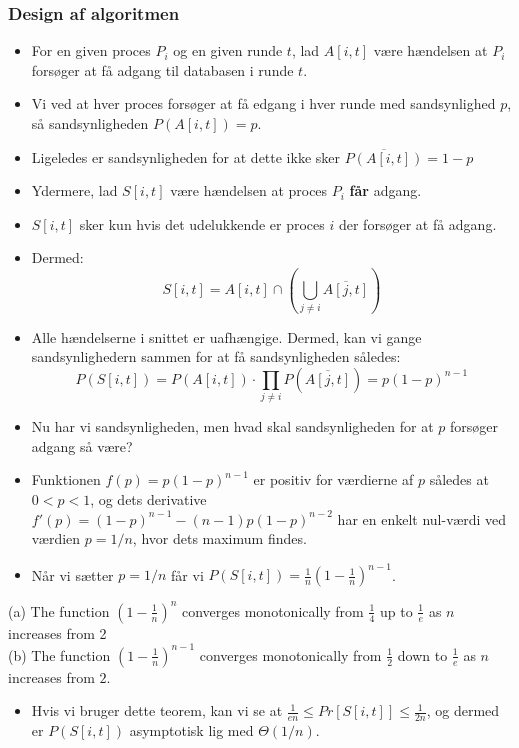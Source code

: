 \documentclass{beamer}
\begin{document}
\begin{frame}[allowframebreaks]
  \frametitle{Design af algoritmen}
 \begin{itemize}
 \item For en given proces $P_{i}$ og en given runde $t$, lad $A[i, t]$ være hændelsen at $P_{i}$ forsøger at få adgang til databasen i runde $t$. 
 \item Vi ved at hver proces forsøger at få edgang i hver runde med sandsynlighed $p$, så sandsynligheden $P(A[i,t]) = p$.
 \item Ligeledes er sandsynligheden for at dette ikke sker $\overline{P(A[i,t])} = 1-p$
 \item Ydermere, lad $S[i,t]$ være hændelsen at proces $P_{i}$ \textbf{får} adgang.
 \item $S[i,t]$ sker kun hvis det udelukkende er proces $i$ der forsøger at få adgang. 
 \item Dermed: \[ S[i,t] = A[i,t] \cap \left( \bigcup\limits_{j \neq i}^{} \overline{A[j,t]} \right) \]
 \item Alle hændelserne i snittet er uafhængige. Dermed, kan vi gange sandsynlighedern sammen for at få sandsynligheden således: \[ P(S[i,t]) = P(A[i,t]) \cdot \prod_{j \neq i} P(\overline{ A[j,t] }) = p(1-p)^{n-1}\]
 \item Nu har vi sandsynligheden, men hvad skal sandsynligheden for at $p$ forsøger adgang så være? 
 \item Funktionen $f(p) = p(1-p)^{n-1}$ er positiv for værdierne af $p$ således at $0 < p < 1$, og dets derivative $f'(p) = (1-p)^{n-1}-(n-1)p(1-p)^{n-2}$ har en enkelt nul-værdi ved værdien $p = 1/n$, hvor dets maximum findes. 
 \item Når vi sætter $p = 1/n$ får vi $P(S[i,t]) = \frac{1}{n} \left( 1- \frac{1}{n} \right)^{n-1}$. 
 \end{itemize} 
 \begin{theorem}[13.1]
   (a) The function $\left( 1 - \frac{1}{n} \right)^{n}$ converges monotonically from $\frac{1}{4}$ up to $\frac{1}{e}$ as $n$ increases from 2\\
   (b) The function $\left( 1 - \frac{1}{n} \right)^{n-1}$ converges monotonically from $\frac{1}{2}$ down to $\frac{1}{e}$ as $n$ increases from $2$.
 \end{theorem}
 \begin{itemize}
 \item Hvis vi bruger dette teorem, kan vi se at $\frac{1}{en} \leq Pr[S[i,t]] \leq \frac{1}{2n}$, og dermed er $P(S[i,t])$ asymptotisk lig med $\Theta(1/n)$.
 \end{itemize}
\end{frame}
\end{document}
